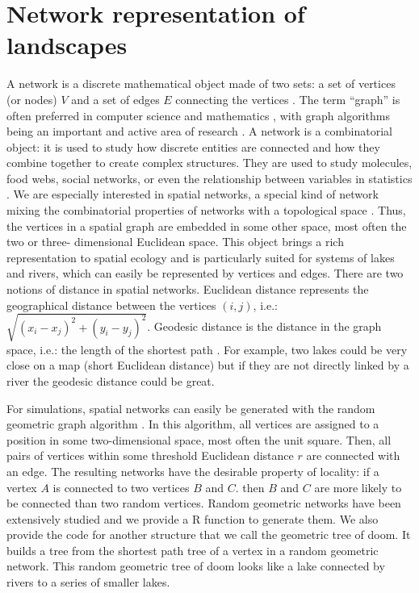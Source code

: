 \documentclass[letterpaper,twocolumn,showkeys]{revtex4-1}
\begin{document}
\section{Network representation of landscapes}

A network is a discrete mathematical object made of two sets: a set of 
vertices (or nodes) $V$ and a set of edges $E$ connecting the vertices
\cite{new10}. The term ``graph'' is often preferred in computer science and 
mathematics \cite{gro06}, with graph algorithms being an important and active 
area of research \cite{sed01}. A network is a combinatorial object: it is 
used to study how discrete entities are connected and how they combine 
together to create complex structures. They are used to study molecules, food 
webs, social networks, or even the relationship between variables in 
statistics \cite{wri21,new10}. We are especially interested in spatial 
networks, a special kind of network mixing the combinatorial properties of 
networks with a topological space \cite{kob94}. Thus, the vertices in a 
spatial graph are embedded in some other space, most often the two or three-
dimensional Euclidean space. This object brings a rich representation to 
spatial ecology and is particularly suited for systems of lakes and rivers, which can 
easily be represented by vertices and edges. There are two notions of 
distance in spatial networks. Euclidean distance represents the geographical 
distance between the vertices $(i, j)$, i.e.: $\sqrt{(x_i - x_j)^2 + (y_i - y_
j)^2}$. Geodesic distance is the distance in the graph space, i.e.: the 
length of the shortest path \cite{dij59}. For example, two lakes could be 
very close on a map (short Euclidean distance) but if they are not directly 
linked by a river the geodesic distance could be great.

For simulations, spatial networks can easily be generated with the random 
geometric graph algorithm \cite{sed01}. In this algorithm, all vertices are 
assigned to a position in some two-dimensional space, most often the unit 
square. Then, all pairs of vertices within some threshold Euclidean distance $r$
are connected with an edge. The resulting networks have the desirable 
property of locality: if a vertex $A$ is connected to two vertices $B$ and $C$.
then $B$ and $C$ are more likely to be connected than two random vertices. 
Random geometric networks have been extensively studied \cite{app97a,app97
b,app02a,app02b,pen03} and we provide a R function to generate them. We also 
provide the code for another structure that we call the geometric tree of 
doom. It builds a tree from the shortest path tree \cite{dij59} of a vertex in 
a random geometric network. This random geometric tree of doom looks like a
lake connected by rivers to a series of smaller lakes. 
\end{document}
